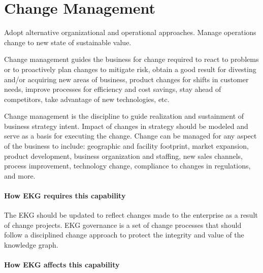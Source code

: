 \section{Change Management}\label{sec:ekg-mm-a-2-3}

Adopt alternative organizational and operational approaches.
Manage operations change to new state of sustainable value.


Change management guides the business for change required to react to problems or to proactively plan changes to
mitigate risk, obtain a good result for divesting and/or acquiring new areas of business, product changes for
shifts in customer needs, improve processes for efficiency and cost savings, stay ahead of competitors,
take advantage of new technologies, etc.

Change management is the discipline to guide realization and sustainment of business strategy intent.
Impact of changes in strategy should be modeled and serve as a basis for executing the change.
Change can be managed for any aspect of the business to include: geographic and facility footprint, market expansion,
product development, business organization and staffing, new sales channels, process improvement, technology change,
compliance to changes in regulations, and more.

\ekgmmContextSection

\paragraph*{How EKG requires this capability}
The EKG should be updated to reflect changes made to the enterprise as a result of change projects.
EKG governance is a set of change processes that should follow a disciplined change approach to protect the
integrity and value of the knowledge graph.

\paragraph{How EKG affects this capability}

